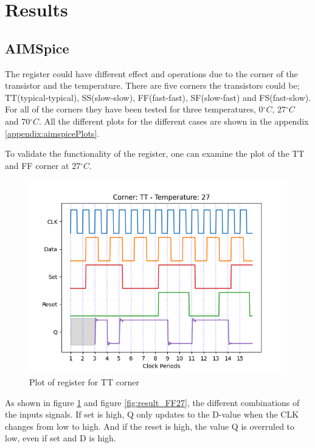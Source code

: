 \section{Results}
\label{sec:results}

\subsection{AIMSpice}

The register could have different effect and operations due to the corner of the transistor and the temperature. There are five corners the transistors could be; TT(typical-typical), SS(slow-slow), FF(fast-fast), SF(slow-fast) and FS(fast-slow).  For all of the corners they have been tested for three temperatures, 0$^\circ C$, 27$^\circ C$ and 70$^\circ C$. All the different plots for the different cases are shown in the appendix \ref{appendix:aimspicePlots}. 

To validate the functionality of the register, one can examine the plot of the TT and FF corner at 27$^\circ C$. 

\begin{figure}[H]
    \centering
    \includegraphics[width=\textwidth]{Figures/Aimspice_Plots/TT_27.png}
    \caption{Plot of register for TT corner}
    \label{fig:result_TT27}
\end{figure}

As shown in figure \ref{fig:result_TT27} and figure \ref{fig:result_FF27}, the different combinations of the inputs signals. If set is high, Q only updates to the D-value when the CLK changes from low to high. And if the reset is high, the value Q is overruled to low, even if set and D is high.

